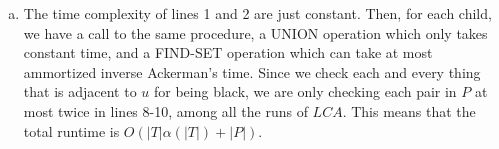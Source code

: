 \documentclass{article}
\begin{document}
\begin{enumerate}[a.]
\item
The time complexity of lines 1 and 2 are just constant. Then, for each child, we have a call to the same procedure, a UNION operation which only takes constant time, and a FIND-SET operation which can take at most ammortized inverse Ackerman's time. Since we check each and every thing that is adjacent to $u$ for being black, we are only checking each pair in $P$ at most twice in lines 8-10, among all the runs of $LCA$. This means that the total runtime is $O(|T| \alpha(|T|) + |P|)$.

\end{enumerate}
\end{document}
